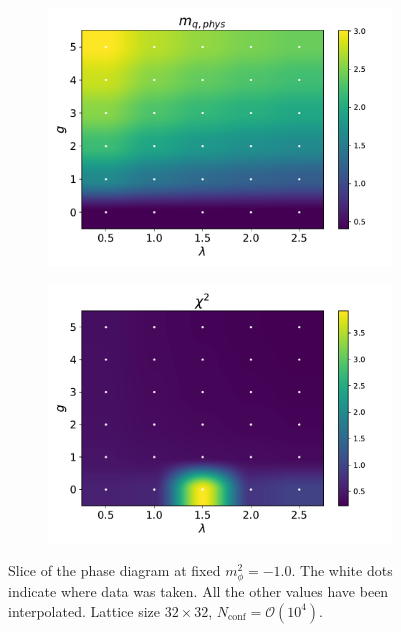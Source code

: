\begin{figure}[]
\begin{subfigure}[b]{0.47\textwidth}
        \includegraphics[width=\textwidth]{figures/phase_diagram/g-lam/phase_diagram_mqphys.pdf}
    \end{subfigure}
    \begin{subfigure}[b]{0.47\textwidth}
        \includegraphics[width=\textwidth]{figures/phase_diagram/g-lam/phase_diagram_chi2.pdf}
    \end{subfigure}
    \caption[Phase diagram in the $\lambda-g$ plane]{Slice of the phase diagram at fixed $m_\phi^2 = -1.0$. The white dots indicate where data was taken. All the other values have been interpolated. Lattice size $32 \times 32$, $N_\text{conf} = \mathcal{O}(10^4)$.}
    \label{fig:phase_diagram_g_lam}
\end{figure}
